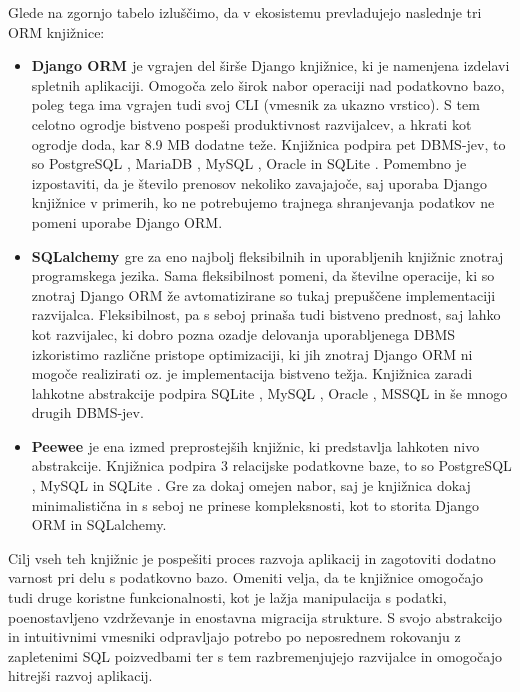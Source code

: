 \documentclass[a4paper,12pt,openright]{book}
\begin{document}
    \noindent
    Glede na zgornjo tabelo izluščimo, da v ekosistemu prevladujejo naslednje tri ORM knjižnice:
    \begin{itemize}
        \item \textbf{Django ORM \cite{DJANGO_GITHUB}} je vgrajen del širše Django knjižnice, ki je namenjena izdelavi spletnih aplikaciji. Omogoča zelo širok nabor operaciji nad podatkovno bazo, poleg tega ima vgrajen tudi svoj CLI (vmesnik za ukazno vrstico). S tem celotno ogrodje bistveno pospeši produktivnost razvijalcev, a hkrati kot ogrodje doda, kar 8.9 MB dodatne teže. Knjižnica podpira pet DBMS-jev, to so PostgreSQL \cite{POSTGRESQL}, MariaDB \cite{MARIADB}, MySQL \cite{MYSQL}, Oracle \cite{ORACLE} in SQLite \cite{SQLITE}. Pomembno je izpostaviti, da je število prenosov nekoliko zavajajoče, saj uporaba Django knjižnice v primerih, ko ne potrebujemo trajnega shranjevanja podatkov ne pomeni uporabe Django ORM.
        \item \textbf{SQLalchemy \cite{SQLALCHEMY_GITHUB}} gre za eno najbolj fleksibilnih in uporabljenih knjižnic znotraj programskega jezika. Sama fleksibilnost pomeni, da številne operacije, ki so znotraj Django ORM že avtomatizirane so tukaj prepuščene implementaciji razvijalca. Fleksibilnost, pa s seboj prinaša tudi bistveno prednost, saj lahko kot razvijalec, ki dobro pozna ozadje delovanja uporabljenega DBMS izkoristimo različne pristope optimizaciji, ki jih znotraj Django ORM ni mogoče realizirati oz. je implementacija bistveno težja. Knjižnica zaradi lahkotne abstrakcije podpira SQLite \cite{SQLITE}, MySQL \cite{MYSQL}, Oracle \cite{ORACLE}, MSSQL \cite{MSSQL} in še mnogo drugih DBMS-jev.
        \item \textbf{Peewee \cite{PEEWEE_GITHUB}} je ena izmed preprostejših knjižnic, ki predstavlja lahkoten nivo abstrakcije. Knjižnica podpira 3 relacijske podatkovne baze, to so PostgreSQL \cite{POSTGRESQL}, MySQL \cite{MYSQL} in SQLite \cite{SQLITE}. Gre za dokaj omejen nabor, saj je knjižnica dokaj minimalistična in s seboj ne prinese kompleksnosti, kot to storita Django ORM in SQLalchemy.
    \end{itemize}

    \noindent
    Cilj vseh teh knjižnic je pospešiti proces razvoja aplikacij in zagotoviti dodatno varnost pri delu s podatkovno bazo. Omeniti velja, da te knjižnice omogočajo tudi druge koristne funkcionalnosti, kot je lažja manipulacija s podatki, poenostavljeno vzdrževanje in enostavna migracija strukture. S svojo abstrakcijo in intuitivnimi vmesniki odpravljajo potrebo po neposrednem rokovanju z zapletenimi SQL poizvedbami ter s tem razbremenjujejo razvijalce in omogočajo hitrejši razvoj aplikacij.
\end{document}
